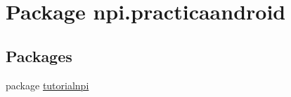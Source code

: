 \hypertarget{namespacenpi_1_1practicaandroid}{\section{Package npi.\-practicaandroid}
\label{namespacenpi_1_1practicaandroid}
}
\subsection*{Packages}
\begin{DoxyCompactItemize}
\item 
package \hyperlink{namespacenpi_1_1practicaandroid_1_1tutorialnpi}{tutorialnpi}
\end{DoxyCompactItemize}
